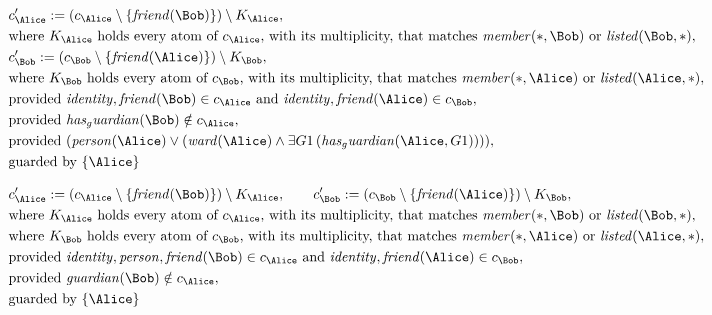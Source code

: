 \begin{align*}
&
c'_
{
\Alice
}
 := 
(c_
{
\Alice
}
 \setminus 
\{
\mathit{
friend
}
(
\Bob
)
\}
) \setminus K_
{
\Alice
}
,\\
&
\text{where } K_
{
\Alice
}
 \text{ holds every atom of } c_
{
\Alice
}
 \text{, with its multiplicity, that matches } 
\mathit{
member
}
(
\ast
,
\Bob
)
 \text{ or } 
\mathit{
listed
}
(
\Bob
,
\ast
)
,\\
&
c'_
{
\Bob
}
 := 
(c_
{
\Bob
}
 \setminus 
\{
\mathit{
friend
}
(
\Alice
)
\}
) \setminus K_
{
\Bob
}
,\\
&
\text{where } K_
{
\Bob
}
 \text{ holds every atom of } c_
{
\Bob
}
 \text{, with its multiplicity, that matches } 
\mathit{
member
}
(
\ast
,
\Alice
)
 \text{ or } 
\mathit{
listed
}
(
\Alice
,
\ast
)
,\\
&
\text{provided } 
\mathit{
identity
}
,
\mathit{
friend
}
(
\Bob
)
 \in c_
{
\Alice
}
 \text{ and } 
\mathit{
identity
}
,
\mathit{
friend
}
(
\Alice
)
 \in c_
{
\Bob
}
,\\
&
\text{provided } 
\mathit{
has_guardian
}
(
\Bob
)
 \notin c_
{
\Alice
}
,\\
&
\text{provided } 
(
\mathit{
person
}
(
\Alice
)
\lor
(
\mathit{
ward
}
(
\Alice
)
\land
\exists 
G1
\,(
\mathit{
has_guardian
}
(
\Alice
,
G1
)
)
)
)
,\\
&
\text{guarded by } \{
\Alice
\}
\end{align*}

\begin{align*}
&
c'_
{
\Alice
}
 := 
(c_
{
\Alice
}
 \setminus 
\{
\mathit{
friend
}
(
\Bob
)
\}
) \setminus K_
{
\Alice
}
, \qquad 
c'_
{
\Bob
}
 := 
(c_
{
\Bob
}
 \setminus 
\{
\mathit{
friend
}
(
\Alice
)
\}
) \setminus K_
{
\Bob
}
,\\
&
\text{where } K_
{
\Alice
}
 \text{ holds every atom of } c_
{
\Alice
}
 \text{, with its multiplicity, that matches } 
\mathit{
member
}
(
\ast
,
\Bob
)
 \text{ or } 
\mathit{
listed
}
(
\Bob
,
\ast
)
,\\
&
\text{where } K_
{
\Bob
}
 \text{ holds every atom of } c_
{
\Bob
}
 \text{, with its multiplicity, that matches } 
\mathit{
member
}
(
\ast
,
\Alice
)
 \text{ or } 
\mathit{
listed
}
(
\Alice
,
\ast
)
,\\
&
\text{provided } 
\mathit{
identity
}
,
\mathit{
person
}
,
\mathit{
friend
}
(
\Bob
)
 \in c_
{
\Alice
}
 \text{ and } 
\mathit{
identity
}
,
\mathit{
friend
}
(
\Alice
)
 \in c_
{
\Bob
}
,\\
&
\text{provided } 
\mathit{
guardian
}
(
\Bob
)
 \notin c_
{
\Alice
}
,\\
&
\text{guarded by } \{
\Alice
\}
\end{align*}
